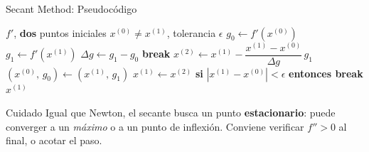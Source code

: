 \begin{frame}{Secant Method: Pseudocódigo}
    \scriptsize
    \begin{algorithmic}[1]
        \Require $f'$, \textbf{dos} puntos iniciales $x^{(0)} \neq x^{(1)}$,
                 tolerancia $\epsilon$
        \State $g_0 \gets f'(x^{(0)})$
            \State $g_1 \gets f'(x^{(1)})$
            \State $\Delta g \gets g_1 - g_0$
                \State \textbf{break}
            \EndIf
            \State $x^{(2)} \gets x^{(1)} - \dfrac{x^{(1)}-x^{(0)}}{\Delta g}\, g_1$
            \State $(x^{(0)},\, g_0) \gets (x^{(1)},\, g_1)$
            \State $x^{(1)} \gets x^{(2)}$
            \State \textbf{si} $|x^{(1)} - x^{(0)}| < \epsilon$ \textbf{entonces break}
        \EndFor
        \State \Return $x^{(1)}$
    \end{algorithmic}

    \vspace{0.4em}
    \begin{alertblock}{Cuidado}
        \tiny
        Igual que Newton, el secante busca un punto \textbf{estacionario}: puede
        converger a un \emph{máximo} o a un punto de inflexión. Conviene verificar
        $f''>0$ al final, o acotar el paso.
    \end{alertblock}
\end{frame}

